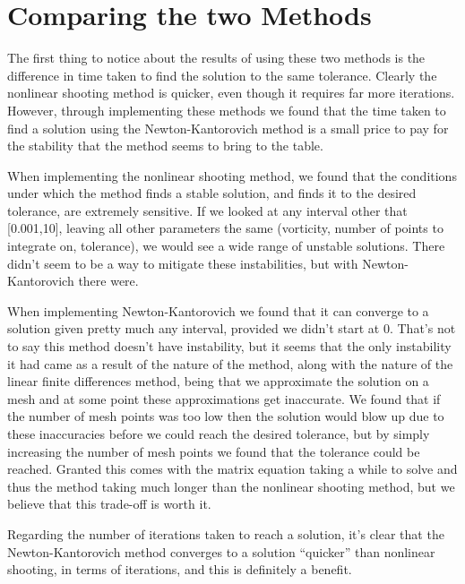 \documentclass[12pt]{article}
\numberwithin{equation}{section}
\numberwithin{figure}{section}
\numberwithin{table}{section}
\begin{document}
\section{Comparing the two Methods}\label{sec:Analysis}
\par The first thing to notice about the results of using these two methods is the difference in time taken to find the solution to the same tolerance. Clearly the nonlinear shooting method is quicker, even though it requires far more iterations. However, through implementing these methods we found that the time taken to find a solution using the Newton-Kantorovich method is a small price to pay for the stability that the method seems to bring to the table.
\par When implementing the nonlinear shooting method, we found that the conditions under which the method finds a stable solution, and finds it to the desired tolerance, are extremely sensitive. If we looked at any interval other that [0.001,10], leaving all other parameters the same (vorticity, number of points to integrate on, tolerance), we would see a wide range of unstable solutions. There didn't seem to be a way to mitigate these instabilities, but with Newton-Kantorovich there were.
\par When implementing Newton-Kantorovich we found that it can converge to a solution given pretty much any interval, provided we didn't start at 0. That's not to say this method doesn't have instability, but it seems that the only instability it had came as a result of the nature of the method, along with the nature of the linear finite differences method, being that we approximate the solution on a mesh and at some point these approximations get inaccurate. We found that if the number of mesh points was too low then the solution would blow up due to these inaccuracies before we could reach the desired tolerance, but by simply increasing the number of mesh points we found that the tolerance could be reached. Granted this comes with the matrix equation taking a while to solve and thus the method taking much longer than the nonlinear shooting method, but we believe that this trade-off is worth it. 
\par Regarding the number of iterations taken to reach a solution, it's clear that the Newton-Kantorovich method converges to a solution ``quicker'' than nonlinear shooting, in terms of iterations, and this is definitely a benefit. 
\end{document}
